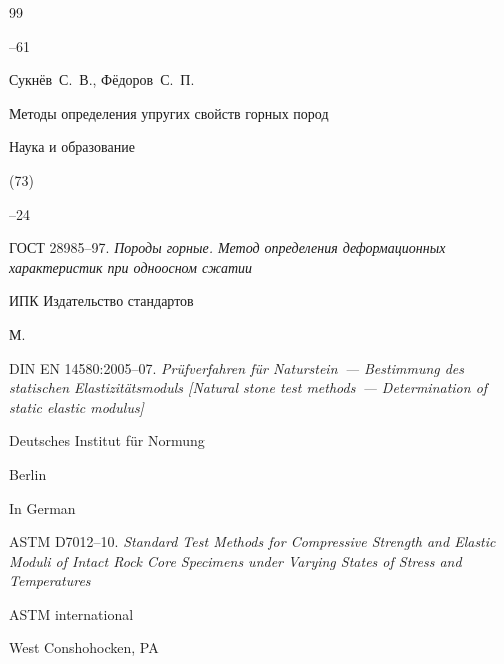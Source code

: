 \begin{thebibliography}{99}


--61







\by Сукнёв~С.~В., Фёдоров~С.~П.

\paper Методы определения упругих свойств горных пород

\jour Наука и образование


(73)

--24











\thesis \rm ГОСТ 28985--97. \it Породы горные. Метод определения деформационных характеристик при одноосном сжатии

\publ ИПК Издательство стандартов

\publaddr М.






\thesis \rm DIN EN 14580:2005--07. \it  Pr\"ufverfahren f\"ur Naturstein~--- Bestimmung des statischen Elastizit\"atsmoduls \rm [Natural stone test methods~--- Determination of static elastic modulus]

\publ Deutsches Institut f\"ur Normung

\publaddr Berlin



\lang In German




\thesis \rm ASTM D7012--10. \it  Standard Test Methods for Compressive Strength and Elastic Moduli of Intact Rock Core Specimens under Varying States of Stress and Temperatures

\publ ASTM international

\publaddr West Conshohocken, PA


\end{thebibliography}

